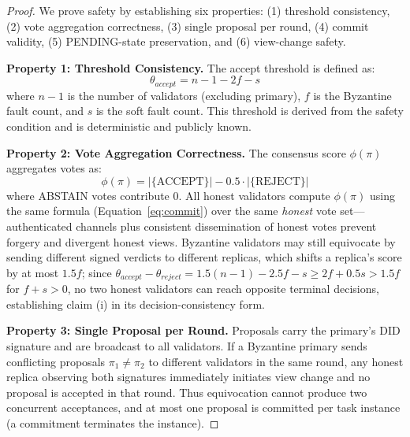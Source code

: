 \documentclass{article}
\begin{document}
\begin{proof}
We prove safety by establishing six properties: (1) threshold consistency, (2) vote aggregation correctness, (3) single proposal per round, (4) commit validity, (5) PENDING-state preservation, and (6) view-change safety.

\textbf{Property 1: Threshold Consistency.}
The accept threshold is defined as:
\begin{equation}
    \theta_{accept} = n - 1 - 2f - s
\end{equation}
where $n-1$ is the number of validators (excluding primary), $f$ is the Byzantine fault count, and $s$ is the soft fault count. This threshold is derived from the safety condition and is deterministic and publicly known.

\textbf{Property 2: Vote Aggregation Correctness.}
The consensus score $\phi(\pi)$ aggregates votes as:
\begin{equation}
    \phi(\pi) = |\{\text{ACCEPT}\}| - 0.5 \cdot |\{\text{REJECT}\}|
\end{equation}
where ABSTAIN votes contribute 0. All honest validators compute $\phi(\pi)$ using the same formula (Equation~\ref{eq:commit}) over the same \emph{honest} vote set---authenticated channels plus consistent dissemination of honest votes prevent forgery and divergent honest views. Byzantine validators may still equivocate by sending different signed verdicts to different replicas, which shifts a replica's score by at most $1.5f$; since $\theta_{accept}-\theta_{reject} = 1.5(n-1)-2.5f-s \geq 2f+0.5s > 1.5f$ for $f+s>0$, no two honest validators can reach opposite terminal decisions, establishing claim (i) in its decision-consistency form.

\textbf{Property 3: Single Proposal per Round.}
Proposals carry the primary's DID signature and are broadcast to all validators. If a Byzantine primary sends conflicting proposals $\pi_1 \neq \pi_2$ to different validators in the same round, any honest replica observing both signatures immediately initiates view change and no proposal is accepted in that round. Thus equivocation cannot produce two concurrent acceptances, and at most one proposal is committed per task instance (a commitment terminates the instance).


\end{proof}
\end{document}
